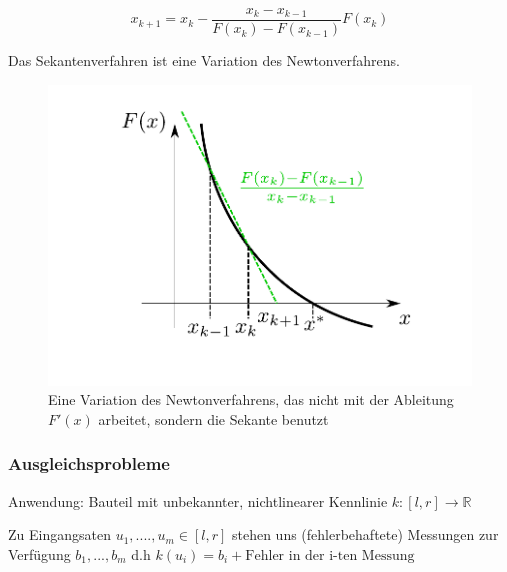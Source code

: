 \documentclass[10pt,a4paper]{article}
\begin{document}
\begin{defi}
$$x_{k+1}=x_k - \frac{x_k-x_{k-1}}{F(x_k)-F(x_{k-1})} F(x_k)$$

Das Sekantenverfahren ist eine Variation des Newtonverfahrens.

\begin{figure}[H]
\includegraphics[width=\textwidth]{images/newton_verfahren_sekante}
\caption{Eine Variation des Newtonverfahrens, das nicht mit der Ableitung $F'(x)$ arbeitet, sondern die Sekante  benutzt}
\end{figure}

\end{defi}

\subsubsection{Ausgleichsprobleme}

Anwendung:
Bauteil mit unbekannter, nichtlinearer Kennlinie $k:[l,r] \rightarrow \mathbb{R}$

Zu Eingangsaten $u_1,....,u_m \in [l,r]$ stehen uns (fehlerbehaftete) Messungen zur Verfügung $b_1,...,b_m$ d.h $k(u_i)=b_i + \text{Fehler in der i-ten Messung}$
\end{document}
